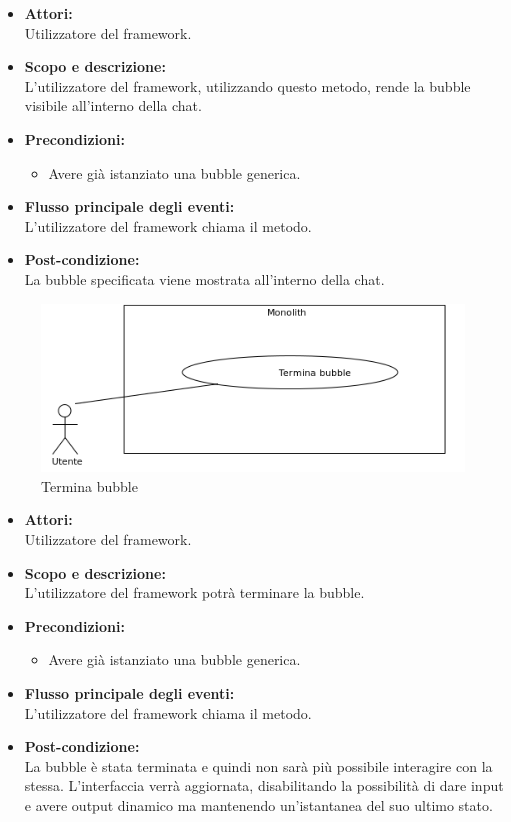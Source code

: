 \begin{itemize}
	\item \textbf{Attori:}
	\\Utilizzatore del framework.
	\item \textbf{Scopo e descrizione:} 
	\\L'utilizzatore del framework, utilizzando questo metodo, rende la bubble visibile all'interno della chat.
	\item \textbf{Precondizioni:}
	\begin{itemize}
		\item Avere già istanziato una bubble generica.
	\end{itemize}
	\item \textbf{Flusso principale degli eventi:}
	\\L'utilizzatore del framework chiama il metodo.
	\item \textbf{Post-condizione:}
	\\La bubble specificata viene mostrata all'interno della chat.
\end{itemize}


\begin{figure}[H]
	\centering
	\includegraphics[width=15cm]{../../documenti/AnalisiDeiRequisiti/Diagrammi_img/uc1_19.png}
	\caption{\UCCaption{} Termina bubble}
\end{figure}

\begin{itemize}
	\item \textbf{Attori:}
	\\Utilizzatore del framework.
	\item \textbf{Scopo e descrizione:} 
	\\L'utilizzatore del framework potrà terminare la bubble.
	\item \textbf{Precondizioni:}
	\begin{itemize}
		\item Avere già istanziato una bubble generica.
	\end{itemize}
	\item \textbf{Flusso principale degli eventi:}
	\\L'utilizzatore del framework chiama il metodo.
	\item \textbf{Post-condizione:}
	\\La bubble è stata terminata e quindi non sarà più possibile interagire con la stessa. L'interfaccia verrà aggiornata, disabilitando la possibilità di dare input e avere output dinamico ma mantenendo un'istantanea del suo ultimo stato.
\end{itemize}